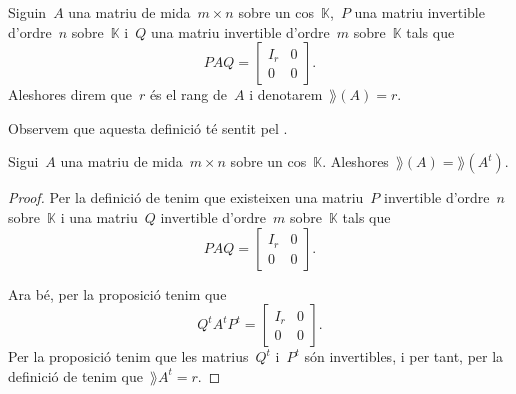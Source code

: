 \documentclass[../../main.tex]{subfiles}
\begin{document}
    \begin{definition}[Rang]
        \label{def:rang d'una matriu}
        Siguin~\(A\) una matriu de mida~\(m\times n\) sobre un cos~\(\mathbb{K}\),~\(P\) una matriu invertible d'ordre~\(n\) sobre~\(\mathbb{K}\) i~\(Q\) una matriu invertible d'ordre~\(m\) sobre~\(\mathbb{K}\) tals que
        \[PAQ=\left[\begin{array}{c|c}
        I_{r} & 0 \\\hline
        0 & 0
        \end{array}\right].\]
        Aleshores direm que~\(r\) és el rang de~\(A\) i denotarem~\(\rang(A)=r\).

        Observem que aquesta definició té sentit pel .
    \end{definition}
    \begin{proposition}
        \label{prop:rang de la matriu transposada és el rang de la matriu}
        Sigui~\(A\) una matriu de mida~\(m\times n\) sobre un cos~\(\mathbb{K}\).
        Aleshores~\(\rang(A)=\rang(A^{t})\).
        \begin{proof}
            Per la definició de  tenim que existeixen una matriu~\(P\) invertible d'ordre~\(n\) sobre~\(\mathbb{K}\) i una matriu~\(Q\) invertible d'ordre~\(m\) sobre~\(\mathbb{K}\) tals que
            \[PAQ=\left[\begin{array}{c|c}
            I_{r} & 0 \\\hline
            0 & 0
            \end{array}\right].\]

            Ara bé, per la proposició  tenim que
            \[Q^{t}A^{t}P^{t}=\left[\begin{array}{c|c}
            I_{r} & 0 \\\hline
            0 & 0
            \end{array}\right].\]
            Per la proposició  tenim que les matrius~\(Q^{t}\) i~\(P^{t}\) són invertibles, i per tant, per la definició de  tenim que~\(\rang{A^{t}}=r\).
        \end{proof}
    \end{proposition}
\end{document}
